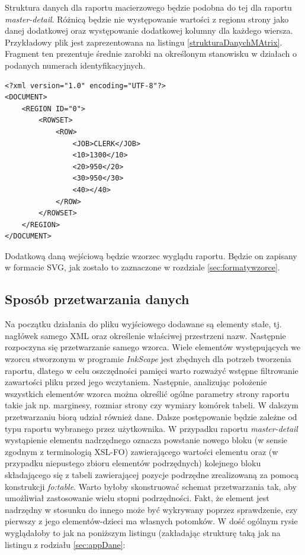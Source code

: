 \documentclass[11pt,a4paper]{article}
\begin{document}
Struktura danych dla raportu macierzowego będzie podobna do tej dla raportu \emph{master-detail}. Różnicą będzie nie występowanie wartości z regionu strony jako danej dodatkowej oraz występowanie dodatkowej kolumny dla każdego wiersza. Przykładowy plik jest zaprezentowana na listingu \ref{strukturaDanychMAtrix}. Fragment ten prezentuje średnie zarobki na określonym stanowisku w działach o podanych numerach identyfikacyjnych.

\lstset{language=XML}
\begin{lstlisting}[frame=single,caption=Zakładana struktura pliku z danymi wejściowymi dla raportu macierzowego,label=strukturaDanychMAtrix]
<?xml version="1.0" encoding="UTF-8"?>
<DOCUMENT>
    <REGION ID="0">
        <ROWSET>
            <ROW>
                <JOB>CLERK</JOB>
                <10>1300</10>
                <20>950</20>
                <30>950</30>
                <40></40>
            </ROW>
        </ROWSET>
    </REGION>
</DOCUMENT>
\end{lstlisting}


Dodatkową daną wejściową będzie wzorzec wyglądu raportu. Będzie on zapisany w formacie SVG, jak zostało to zaznaczone w rozdziale \ref{sec:formatywzorce}.

\subsection{Sposób przetwarzania danych}\label{sec:appPrzetwarzanie}
Na początku działania do pliku wyjściowego dodawane są elementy stałe, tj. nagłówek samego XML oraz określenie właściwej przestrzeni nazw. Następnie rozpoczyna się przetwarzanie samego wzorca. Wiele elementów występujących we wzorcu stworzonym w programie \emph{InkScape} jest zbędnych dla potrzeb tworzenia raportu, dlatego w celu oszczędności pamięci warto rozważyć wstępne filtrowanie zawartości pliku przed jego wczytaniem. Następnie, analizując położenie wszystkich elementów wzorca można określić ogólne parametry strony raportu takie jak np. marginesy, rozmiar strony czy wymiary komórek tabeli. W dalszym przetwarzaniu biorą udział również dane. Dalsze postępowanie będzie zależne od typu raportu wybranego przez użytkownika. W przypadku raportu \emph{master-detail} wystąpienie elementu nadrzędnego oznacza powstanie nowego bloku (w sensie zgodnym z terminologią XSL-FO) zawierającego wartości elementu oraz (w przypadku niepustego zbioru elementów podrzędnych) kolejnego bloku składającego się z tabeli zawierającej pozycje podrzędne zrealizowaną za pomocą konstrukcji \emph{fo:table}. Warto byłoby skonstruować schemat przetwarzania tak, aby umożliwiał zastosowanie wielu stopni podrzędności. Fakt, że element jest nadrzędny w stosunku do innego może być wykrywany poprzez sprawdzenie, czy pierwszy z jego elementów-dzieci ma własnych potomków. W dość ogólnym rysie wyglądałoby to jak na poniższym listingu (zakładając strukturę taką jak na listingu z rodziału \ref{sec:appDane}:\\
\end{document}
